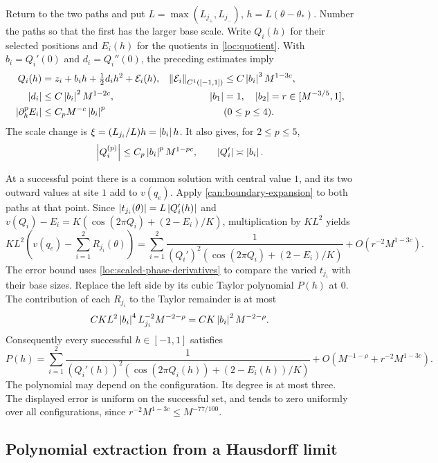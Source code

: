 Return to the two paths and put
$L=\max(L_{j_+},L_{j_-})$, $h=L(\theta-\theta_*)$.
Number the paths so that the first has the larger base scale. Write
$Q_i(h)$ for their selected positions and $E_i(h)$ for the quotients
in \cref{loc:quotient}. With $b_i=Q_i'(0)$ and $d_i=Q_i''(0)$,
the preceding estimates imply
\begin{align}
 Q_i(h)&=z_i+b_ih+\tfrac12d_ih^2+\mathcal E_i(h),
 &\left\lVert\mathcal E_i\right\rVert_{C^1([-1,1])}
   &\le C\left\lvert b_i\right\rvert^3M^{1-3c}, \label{loc:phase-taylor}\\
 \left\lvert d_i\right\rvert&\le C\left\lvert b_i\right\rvert^2M^{1-2c},
 &\left\lvert b_1\right\rvert&=1,\quad
 \left\lvert b_2\right\rvert=r\in[M^{-3/5},1], \label{loc:phase-slopes}\\
 \left\lvert\partial_h^pE_i\right\rvert&\le C_pM^{-c}\left\lvert b_i\right\rvert^p
 &&(0\le p\le4). \label{loc:scaled-quotient}
\end{align}
The scale change is $\xi=(L_{j_i}/L)h=\left\lvert b_i\right\rvert h$.
It also gives, for $2\le p\le5$,
\begin{equation}
 \left\lvert Q_i^{(p)}\right\rvert\le C_p\left\lvert b_i\right\rvert^pM^{1-pc},\qquad
 \left\lvert Q_i'\right\rvert\asymp\left\lvert b_i\right\rvert.
 \label{loc:scaled-phase-derivatives}
\end{equation}

At a successful point there is a common solution with central value
$1$, and its two outward values at site $1$ add to $v(q_e)$.
Apply \cref{can:boundary-expansion} to both paths at that point.
Since $\left\lvert t_{j_i}(\theta)\right\rvert=L\left\lvert Q_i'(h)\right\rvert$ and
$v(Q_i)-E_i=K(\cos(2\pi Q_i)+(2-E_i)/K)$, multiplication by
$KL^2$ yields
\[
 KL^2\left(v(q_e)-\sum_{i=1}^{2}R_{j_i}(\theta)\right)
 =\sum_{i=1}^{2}
 \frac{1}{(Q_i')^2(\cos(2\pi Q_i)+(2-E_i)/K)}
 +O(r^{-2}M^{1-3c}).
\]
The error bound uses \cref{loc:scaled-phase-derivatives} to compare
the varied $t_{j_i}$ with their base sizes. Replace the left side by
its cubic Taylor polynomial $P(h)$ at $0$. The contribution of each
$R_{j_i}$ to the Taylor remainder is at most
\[
 C K L^2\left\lvert b_i\right\rvert^4 L_{j_i}^{-2}M^{-2-\rho}
 =C K\left\lvert b_i\right\rvert^2M^{-2-\rho}.
\]
Consequently every successful $h\in[-1,1]$ satisfies
\begin{equation}
 P(h)=\sum_{i=1}^{2}
 \frac{1}{(Q_i'(h))^2
       (\cos(2\pi Q_i(h))+(2-E_i(h))/K)}
       +O(M^{-1-\rho}+r^{-2}M^{1-3c}).
 \label{loc:cubic-relation}
\end{equation}
The polynomial may depend on the configuration. Its degree is at
most three. The displayed error is uniform on the successful set,
and tends to zero uniformly over all configurations, since
$r^{-2}M^{1-3c}\le M^{-77/100}$.

\subsection{Polynomial extraction from a Hausdorff limit}

